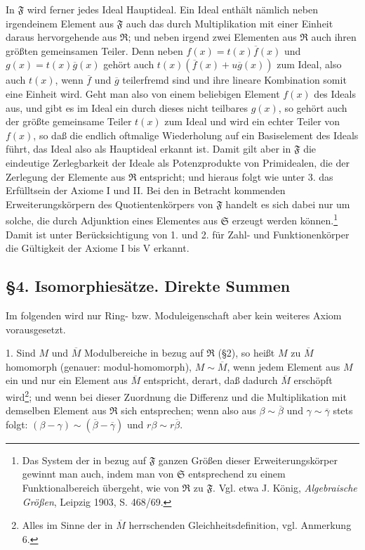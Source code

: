 \documentclass[11pt]{article}
\providecommand{\mR}{\mathfrak{R}}
\providecommand{\mS}{\mathfrak{S}}
\providecommand{\mF}{\mathfrak{F}}
\begin{document}
In $\mF$ wird ferner jedes Ideal Hauptideal. Ein Ideal enthält nämlich neben irgendeinem Element aus $\mF$ auch das durch Multiplikation mit einer Einheit daraus hervorgehende aus $\mR$; und neben irgend zwei Elementen aus $\mR$ auch ihren größten gemeinsamen Teiler. Denn neben $f(x)=t(x)\overline f(x)$ und $g(x)=t(x)\overline g(x)$ gehört auch $t(x)(\overline f(x)+u\overline g(x))$ zum Ideal, also auch $t(x)$, wenn $\overline f$ und $\overline g$ teilerfremd sind und ihre lineare Kombination somit eine Einheit wird. Geht man also von einem beliebigen Element $f(x)$ des Ideals aus, und gibt es im Ideal ein durch dieses nicht teilbares $g(x)$, so gehört auch der größte gemeinsame Teiler $t(x)$ zum Ideal und wird ein echter Teiler von $f(x)$, so daß die endlich oftmalige Wiederholung auf ein Basiselement des Ideals führt, das Ideal also als Hauptideal erkannt ist. Damit gilt aber in $\mF$ die eindeutige Zerlegbarkeit der Ideale als Potenzprodukte von Primidealen, die der Zerlegung der Elemente aus $\mR$ entspricht; und hieraus folgt wie unter 3. das Erfülltsein der Axiome I und II. Bei den in Betracht kommenden Erweiterungskörpern des Quotientenkörpers von $\mF$ handelt es sich dabei nur um solche, die durch Adjunktion eines Elementes aus $\mS$ erzeugt werden können.\footnote{Das System der in bezug auf $\mF$ ganzen Größen dieser Erweiterungskörper gewinnt man auch, indem man von $\mS$ entsprechend zu einem Funktionalbereich übergeht, wie von $\mR$ zu $\mF$. Vgl. etwa J. König, \emph{Algebraische Größen}, Leipzig 1903, S. 468/69.} Damit ist unter Berücksichtigung von 1. und 2. für Zahl- und Funktionenkörper die Gültigkeit der Axiome I bis V erkannt.

\subsection*{§4. Isomorphiesätze. Direkte Summen}

Im folgenden wird nur Ring- bzw. Moduleigenschaft aber kein weiteres Axiom vorausgesetzt.

1. Sind $M$ und $\overline M$ Modulbereiche in bezug auf $\mR$ (§2), so heißt $M$ zu $\overline M$ homomorph (genauer: modul-homomorph), $M\sim\overline M$, wenn jedem Element aus $M$ ein und nur ein Element aus $\overline M$ entspricht, derart, daß dadurch $\overline M$ erschöpft wird\footnote{Alles im Sinne der in $\overline M$ herrschenden Gleichheitsdefinition, vgl. Anmerkung 6.}; und wenn bei dieser Zuordnung die Differenz und die Multiplikation mit demselben Element aus $\mR$ sich entsprechen; wenn also aus $\beta\sim\overline\beta$ und $\gamma\sim\overline\gamma$ stets folgt: $(\beta-\gamma)\sim(\overline\beta-\overline\gamma)$ und $r\beta\sim r\overline\beta$.
\end{document}

